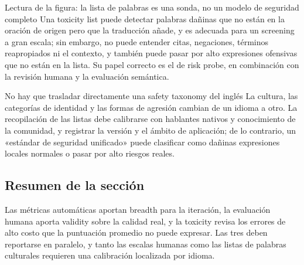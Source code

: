 
\begin{knowledgebox}{Lectura de la figura: la lista de palabras es una sonda, no un modelo de seguridad completo}
Una toxicity list puede detectar palabras dañinas que no están en la oración de origen pero que la traducción añade, y es adecuada para un screening a gran escala; sin embargo, no puede entender citas, negaciones, términos reapropiados ni el contexto, y también puede pasar por alto expresiones ofensivas que no están en la lista. Su papel correcto es el de risk probe, en combinación con la revisión humana y la evaluación semántica.
\end{knowledgebox}

\begin{warningbox}{No hay que trasladar directamente una safety taxonomy del inglés}
La cultura, las categorías de identidad y las formas de agresión cambian de un idioma a otro. La recopilación de las listas debe calibrarse con hablantes nativos y conocimiento de la comunidad, y registrar la versión y el ámbito de aplicación; de lo contrario, un «estándar de seguridad unificado» puede clasificar como dañinas expresiones locales normales o pasar por alto riesgos reales.
\end{warningbox}

\subsection{Resumen de la sección}

Las métricas automáticas aportan breadth para la iteración, la evaluación humana aporta validity sobre la calidad real, y la toxicity revisa los errores de alto costo que la puntuación promedio no puede expresar. Las tres deben reportarse en paralelo, y tanto las escalas humanas como las listas de palabras culturales requieren una calibración localizada por idioma.
